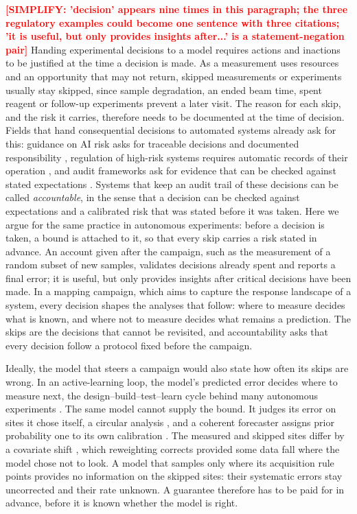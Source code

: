 \documentclass{iopjournal}
\newcommand{\ask}[1]{\textcolor{red}{\textbf{[#1]}}}
\begin{document}
\ask{SIMPLIFY: 'decision' appears nine times in this paragraph; the three regulatory examples could become one sentence with three citations; 'it is useful, but only provides insights after...' is a statement-negation pair} Handing experimental decisions to a model requires actions and inactions to be justified at the time a decision is made. As a measurement uses resources and an opportunity that may not return, skipped measurements or experiments usually stay skipped, since sample degradation, an ended beam time, spent reagent or follow-up experiments prevent a later visit. The reason for each skip, and the risk it carries, therefore needs to be documented at the time of decision. Fields that hand consequential decisions to automated systems already ask for this: guidance on AI risk asks for traceable decisions and documented responsibility \cite{NIST2023}, regulation of high-risk systems requires automatic records of their operation \cite[Art. 12]{EU2024}, and audit frameworks ask for evidence that can be checked against stated expectations \cite{Raji2020}. Systems that keep an audit trail of these decisions can be called \emph{accountable}, in the sense that a decision can be checked against expectations and a calibrated risk that was stated before it was taken. Here we argue for the same practice in autonomous experiments: before a decision is taken, a bound is attached to it, so that every skip carries a risk stated in advance. An account given after the campaign, such as the measurement of a random subset of new samples, validates decisions already spent and reports a final error; it is useful, but only provides insights after critical decisions have been made. In a mapping campaign, which aims to capture the response landscape of a system, every decision shapes the analyses that follow: where to measure decides what is known, and where not to measure decides what remains a prediction. The skips are the decisions that cannot be revisited, and accountability asks that every decision follow a protocol fixed before the campaign.

Ideally, the model that steers a campaign would also state how often its skips are wrong. In an active-learning loop, the model's predicted error decides where to measure next, the design--build--test--learn cycle behind many autonomous experiments \cite{HamediRad2019}. The same model cannot supply the bound. It judges its error on sites it chose itself, a circular analysis \cite{Kriegeskorte2009}, and a coherent forecaster assigns prior probability one to its own calibration \cite{Dawid1982}. The measured and skipped sites differ by a covariate shift \cite{Shimodaira2000,Fannjiang2022}, which reweighting corrects \cite{Tibshirani2019} provided some data fall where the model chose not to look. A model that samples only where its acquisition rule points provides no information on the skipped sites: their systematic errors stay uncorrected and their rate unknown. A guarantee therefore has to be paid for in advance, before it is known whether the model is right.
\end{document}
